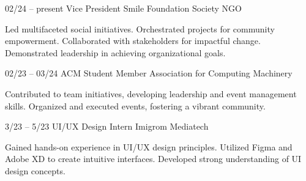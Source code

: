 \documentclass[9pt]{developercv} %
\begin{document}
\vspace{-20 pt}
\begin{entrylist}
	\entry
        {02/24 -- present}
		{Vice President}
		{Smile Foundation Society NGO}
		{\vspace{-10pt}
        \begin{itemize}[noitemsep,topsep=0pt,parsep=0pt,partopsep=0pt, leftmargin=-1pt]
          Led multifaceted social initiatives. Orchestrated projects for community empowerment. Collaborated with stakeholders for impactful change. Demonstrated leadership in achieving organizational goals.

        \end{itemize} 
 }
	\entry
		{02/23 -- 03/24}
		{ACM Student Member}
		{Association for Computing Machinery}
		{\vspace{-10pt}
        \begin{itemize}[noitemsep,topsep=0pt,parsep=0pt,partopsep=0pt, leftmargin=-1pt]
           Contributed to team initiatives, developing leadership and event management skills. Organized and
executed events, fostering a vibrant community.

        \end{itemize} 
       }
	\entry
		{3/23 -- 5/23 }
		{UI/UX Design Intern}
		{Imigrom Mediatech}
		{\vspace{-10pt}
        \begin{itemize}[noitemsep,topsep=0pt,parsep=0pt,partopsep=0pt, leftmargin=-1pt]
          Gained hands-on experience in UI/UX design principles. Utilized Figma and Adobe XD to create
intuitive interfaces. Developed strong understanding of UI design concepts.

        \end{itemize} 
      }
\end{entrylist}
\end{document}
